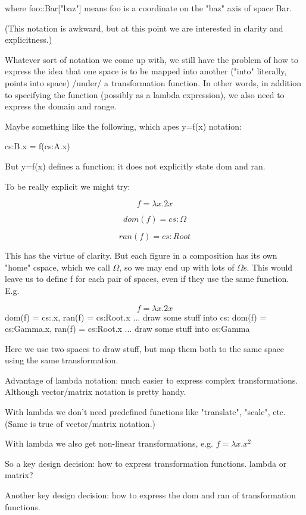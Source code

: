 \documentclass[reqno,12pt]{tufte-handout}
\numberwithin{equation}{subsection}
\numberwithin{equation}{subsection}
\begin{document}
  where foo::Bar["baz"] means foo is a coordinate on the "baz" axis of space Bar.

  (This notation is awkward, but at this point we are interested in
  clarity and explicitness.)

  Whatever sort of notation we come up with, we still have the problem
  of how to express the idea that one space is to be mapped into another
  ("into" literally, points into space) /under/ a transformation
  function.  In other words, in addition to specifying the function
  (possibly as a lambda expression), we also need to express the domain
  and range.

  Maybe something like the following, which apes y=f(x) notation:

  cs:B.x = f(cs:A.x)

  But y=f(x) defines a function; it does not explicitly state dom and ran.

  To be really explicit we might try:

  $$f = \lambda x.2x$$

  $$dom(f) = cs:\Omega$$

  $$ran(f) = cs:Root$$

  This has the virtue of clarity.  But each figure in a composition has
  its own "home" cspace, which we call $\Omega$, so we may end up with lots
  of $\Omega$s.  This would leave us to define f for each pair of spaces,
  even if they use the same function.  E.g.


  $$f = \lambda x.2x$$
  dom(f) = cs:\Omega.x, ran(f) = cs:Root.x
  ... draw some stuff into cs:\Omega
  dom(f) = cs:Gamma.x, ran(f) = cs:Root.x
  ... draw some stuff into cs:Gamma

  Here we use two spaces to draw stuff, but map them both to the same
  space using the same transformation.

  Advantage of lambda notation: much easier to express complex
  transformations.  Although vector/matrix notation is pretty handy.

  With lambda we don't need predefined functions like "translate",
  "scale", etc.  (Same is true of vector/matrix notation.)

  With lambda we also get non-linear transformations, e.g. 
  \(f = \lambda x.x^2\)

  So a key design decision: how to express transformation functions.
  lambda or matrix?

  Another key design decision: how to express the dom and ran of
  transformation functions.
\end{document}
